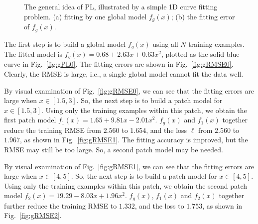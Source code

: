 \documentclass[journal,twocolumn]{IEEEtran}
\begin{document}
\begin{figure}[htbp]\centering
{}
\caption{The general idea of PL, illustrated by a simple 1D curve fitting problem. (a) fitting by one global model $f_g(x)$; (b) the fitting error of $f_g(x)$.} \label{fig:gPL}
\end{figure}

The first step is to build a global model $f_g(x)$ using all $N$ training examples. The fitted model is $f_g(x)=0.68+2.63x+0.63x^2$, plotted as the solid blue curve in Fig.~\ref{fig:gPL0}. The fitting errors are shown in Fig.~\ref{fig:gRMSE0}. Clearly, the RMSE is large, i.e., a single global model cannot fit the data well.

By visual examination of Fig.~\ref{fig:gRMSE0}, we can see that the fitting errors are large when $x\in[1.5,3]$. So, the next step is to build a patch model for $x\in[1.5,3]$. Using only the training examples within this patch, we obtain the first patch model $f_1(x)=1.65+9.81x-2.01x^2$. $f_g(x)$ and $f_1(x)$ together reduce the training RMSE from $2.560$ to $1.654$, and the loss $\ell$ from $2.560$ to $1.967$, as shown in Fig.~\ref{fig:gRMSE1}. The fitting accuracy is improved, but the RMSE may still be too large. So, a second patch model may be needed.

By visual examination of Fig.~\ref{fig:gRMSE1}, we can see that the fitting errors are large when $x\in[4,5]$. So, the next step is to build a patch model for $x\in[4,5]$. Using only the training examples within this patch, we obtain the second patch model $f_2(x)=19.29-8.03x+1.96x^2$. $f_g(x)$, $f_1(x)$ and $f_2(x)$ together further reduce the training RMSE to $1.332$, and the loss to $1.753$, as shown in Fig.~\ref{fig:gRMSE2}.
\end{document}
